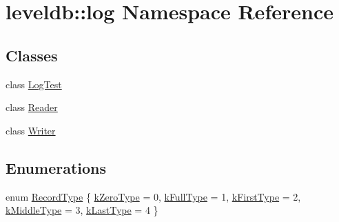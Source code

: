 \hypertarget{namespaceleveldb_1_1log}{}\section{leveldb\+::log Namespace Reference}
\label{namespaceleveldb_1_1log}
\subsection*{Classes}
\begin{DoxyCompactItemize}
\item 
class \mbox{\hyperlink{classleveldb_1_1log_1_1_log_test}{Log\+Test}}
\item 
class \mbox{\hyperlink{classleveldb_1_1log_1_1_reader}{Reader}}
\item 
class \mbox{\hyperlink{classleveldb_1_1log_1_1_writer}{Writer}}
\end{DoxyCompactItemize}
\subsection*{Enumerations}
\begin{DoxyCompactItemize}
\item 
enum \mbox{\hyperlink{namespaceleveldb_1_1log_a01bdc1b51beb634f14f8fbb70fbd8d2a}{Record\+Type}} \{ \newline
\mbox{\hyperlink{namespaceleveldb_1_1log_a01bdc1b51beb634f14f8fbb70fbd8d2aa5a96fbcdf2a8be4834c61233ec2cea2e}{k\+Zero\+Type}} = 0, 
\mbox{\hyperlink{namespaceleveldb_1_1log_a01bdc1b51beb634f14f8fbb70fbd8d2aa2c77e6c3871e8ec5506f9f9c2e7dfb13}{k\+Full\+Type}} = 1, 
\mbox{\hyperlink{namespaceleveldb_1_1log_a01bdc1b51beb634f14f8fbb70fbd8d2aa46ff8d418146ec7ce6c3a883e89b48da}{k\+First\+Type}} = 2, 
\mbox{\hyperlink{namespaceleveldb_1_1log_a01bdc1b51beb634f14f8fbb70fbd8d2aa50ec9d5a2236253d02c0abd55d178e08}{k\+Middle\+Type}} = 3, 
\newline
\mbox{\hyperlink{namespaceleveldb_1_1log_a01bdc1b51beb634f14f8fbb70fbd8d2aa29f913fb4d719f97a9618bca93775dfc}{k\+Last\+Type}} = 4
 \}
\end{DoxyCompactItemize}
